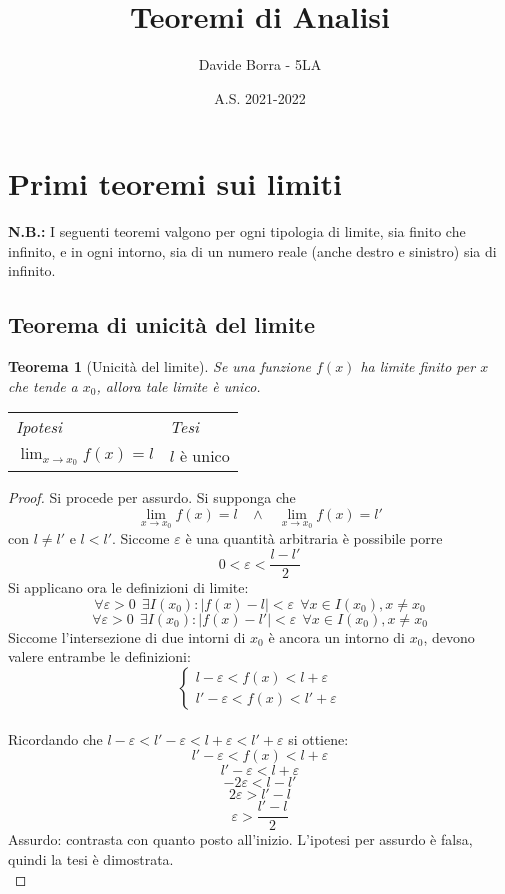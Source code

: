 \documentclass{article}     %
\title{Teoremi di Analisi}
\author{Davide Borra - 5LA}
\date{A.S. 2021-2022}
\newtheorem*{theorem}{Teorema}
\newenvironment{shadedTheorem}%
  {\begin{mdframed}[backgroundcolor=lightgray!40, linecolor=white, innertopmargin=4pt, innerbottommargin=13pt]\begin{theorem}}%
  {\end{theorem}\end{mdframed}}
\begin{document}
\chead{}
\begin{titlepage}
    \maketitle
    \tableofcontents
\end{titlepage}
\section{Primi teoremi sui limiti}
\textbf{N.B.:} I seguenti teoremi valgono per ogni tipologia di limite, sia finito che infinito, e in ogni intorno, sia di un numero reale (anche destro e sinistro) sia di infinito.
    \subsection{Teorema di unicità del limite}
        \begin{shadedTheorem}[Unicità del limite]
            Se una funzione $f(x)$ ha limite finito per $x$ che tende a $x_0$, allora tale limite è unico.
        \end{shadedTheorem}
        \begin{tabular}{m{}m{}}
            \textit{Ipotesi} & \textit{Tesi}  \\
            $\displaystyle\lim_{x\rightarrow x_0}f(x) = l$ & $l$ è unico
        \end{tabular}
        
        \begin{proof}
        Si procede per assurdo. Si supponga che 
        \[\lim_{x\rightarrow x_0}f(x) = l~~~~\land~~~~ \lim_{x\rightarrow x_0}f(x) = l'\]
        con $l\neq l'$ e $l<l'$.
        Siccome $\varepsilon$ è una quantità arbitraria è possibile porre \[0<\varepsilon<\frac{l-l'}{2}\]
        Si applicano ora le definizioni di limite:
        \[\forall \varepsilon > 0 ~~\exists I(x_0) : |f(x)-l|<\varepsilon~~\forall x \in I(x_0), x\neq x_0\]
        \[\forall \varepsilon > 0 ~~\exists I(x_0) : |f(x)-l'|<\varepsilon~~\forall x \in I(x_0), x\neq x_0\]
        Siccome l'intersezione di due intorni di $x_0$ è ancora un intorno di $x_0$, devono valere entrambe le definizioni:
        \[\left\{\begin{array}{l}
            l-\varepsilon < f(x) < l+\varepsilon\\
            l'-\varepsilon < f(x) < l'+\varepsilon 
        \end{array}\right.\]
        \\Ricordando che $l-\varepsilon<l'-\varepsilon < l+\varepsilon < l'+\varepsilon$ si ottiene:
        \[l'-\varepsilon < f(x) < l+\varepsilon\]
        \[l'-\varepsilon < l+\varepsilon\]
        \[-2\varepsilon<l-l'\]
        \[2\varepsilon > l'-l\]
        \[\varepsilon > \frac{l'-l}{2}\]
        Assurdo: contrasta con quanto posto all'inizio. L'ipotesi per assurdo è falsa, quindi la tesi è dimostrata.\\
        \end{proof}
        
\end{document}

